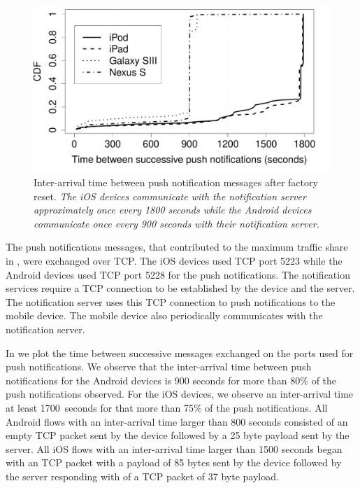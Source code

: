\begin{figure}
\includegraphics[width=\columnwidth]{plots/push_inter_arrival.pdf}
\caption{Inter-arrival time between push notification messages after factory reset. \emph{The iOS devices communicate with the notification server approximately once every 1800 seconds while the Android devices communicate once every 900 seconds with their notification server. }}
\label{fig:inter-arrival-push}
\end{figure}

The push notifications messages, that contributed to the maximum traffic share in , were exchanged over TCP. 
The iOS devices used TCP port 5223 while the Android devices used TCP port 5228 for the push notifications.
The notification services require a TCP connection to be established by the device and the server. 
The notification server uses this TCP connection to push notifications to the mobile device. 
The mobile device also periodically communicates with the notification server. 

In  we plot the time between successive messages exchanged on the ports used for push notifications. 
We observe that the inter-arrival time between push notifications for the Android devices is 900 seconds for more than 80\% of the push notifications observed. 
For the iOS devices, we observe an inter-arrival time at least 1700~seconds for that more than 75\% of the push notifications. 
All Android flows with an inter-arrival time larger than 800 seconds consisted of an empty TCP packet sent by the device followed by a 25 byte payload sent by the server.
All iOS flows with an inter-arrival time larger than 1500 seconds began with an TCP packet with a payload of 85 bytes sent by the device followed by the server responding with of a TCP packet of 37 byte payload.

